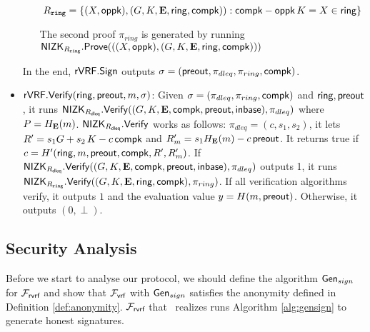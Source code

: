 \begin{itemize}
\begin{itemize}
		\begin{equation}
			R_{\mathtt{ring}} = \{(X, \mathsf{oppk}),(G,K,{\mathbf{E}},\mathsf{ring}, \mathsf{compk})): \mathsf{compk}-\mathsf{oppk} \, K = X \in \mathsf{ring}\} \label{rel:snark}
		\end{equation}
		
		
		The second proof $ \pi_{ring} $ is generated by running 
		$ {\mathsf{NIZK}}_{R_{\mathtt{ring}}}.{\mathsf{Prove}}(((X, \mathsf{oppk}),(G,K,{\mathbf{E}},\mathsf{ring}, \mathsf{compk}))) $ 
	\end{itemize}
	In the end, $ {\mathsf{rVRF}}.{\mathsf{Sign}} $ outputs $\sigma = ({\mathsf{preout}},\pi_{dleq}, \pi_{ring}, \mathsf{compk}) $.
	
	\item $ {\mathsf{rVRF}}.{\mathsf{Verify}}(\mathsf{ring},{\mathsf{preout}}, m, \sigma) $: Given $  \sigma = (\pi_{dleq}, \pi_{ring},\mathsf{compk})  $ and $ \mathsf{ring}, {\mathsf{preout}} $,
	it runs $ {\mathsf{NIZK}}_{R_{\mathsf{dleq}}}.{\mathsf{Verify}}((G, K,{\mathbf{E}},\mathsf{compk},{\mathsf{preout}},{\mathsf{inbase}}), \pi_{dleq} ) $ where $ P = H_{\mathbf{E}}(m) $. $ {\mathsf{NIZK}}_{R_{\mathsf{dleq}}}.{\mathsf{Verify}} $ works as follows: $ \pi_{dleq} = (c,s_1, s_2) $, it lets $R' = s_1 G + s_2 \, K - c \,\mathsf{compk}$ and $R'_m = s_1 H_{\mathbf{E}}(m) - c \, {\mathsf{preout}}$. It
	returns true if $c = H'(\mathsf{ring},m,{\mathsf{preout}},\mathsf{compk},R',R'_m)$. If  $ {\mathsf{NIZK}}_{R_{\mathsf{dleq}}}.{\mathsf{Verify}}((G, K,{\mathbf{E}},\mathsf{compk},{\mathsf{preout}},{\mathsf{inbase}}), \pi_{dleq} ) $ outputs 1, it runs $ {\mathsf{NIZK}}_{R_{\mathtt{ring}}}.{\mathsf{Verify}}((G,K,{\mathbf{E}},\mathsf{ring}, \mathsf{compk}), \pi_{ring}) $. 
	If all verification algorithms verify, it outputs $ 1 $ and the evaluation value $ y =  H(m,{\mathsf{preout}})  $. Otherwise, it outputs $( 0, \perp) $.
	
\end{itemize}

\subsection{Security Analysis}

Before we start to analyse our protocol, we should define the algorithm $ \mathsf{Gen}_{sign} $  for $ \mathcal{F}_{\textsf{rvrf}} $ and show that $ \mathcal{F}_{\textsf{vrf}} $ with $ \mathsf{Gen}_{sign} $ satisfies the anonymity defined in Definition \ref{def:anonymity}. $ \mathcal{F}_{\textsf{rvrf}} $ that \name \ realizes runs  Algorithm \ref{alg:gensign} to generate honest signatures.



